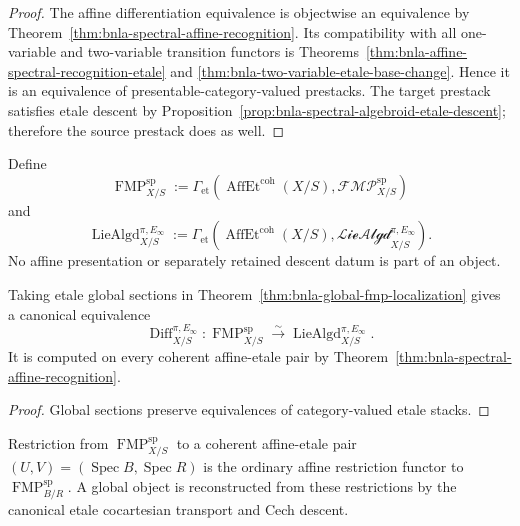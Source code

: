 \begin{proof}
The affine differentiation equivalence is objectwise an equivalence by
Theorem~\ref{thm:bnla-spectral-affine-recognition}.  Its compatibility with
all one-variable and two-variable transition functors is
Theorems~\ref{thm:bnla-affine-spectral-recognition-etale} and
\ref{thm:bnla-two-variable-etale-base-change}.  Hence it is an equivalence of
presentable-category-valued prestacks.  The target prestack satisfies etale
descent by
Proposition~\ref{prop:bnla-spectral-algebroid-etale-descent}; therefore the
source prestack does as well.
\end{proof}

\begin{definition}
\label{def:bnla-global-spectral-pair-sections}
Define
\[
\boxed{
    \operatorname{FMP}^{\mathrm{sp}}_{X/S}
    :=
    \Gamma_{\mathrm{et}}
    \left(
        \operatorname{AffEt}^{\mathrm{coh}}(X/S),
        \mathscr{FMP}^{\mathrm{sp}}_{X/S}
    \right)}
\]
and
\[
\boxed{
    \operatorname{LieAlgd}^{\pi,E_\infty}_{X/S}
    :=
    \Gamma_{\mathrm{et}}
    \left(
        \operatorname{AffEt}^{\mathrm{coh}}(X/S),
        \mathscr{LieAlgd}^{\pi,E_\infty}_{X/S}
    \right).}
\]
No affine presentation or separately retained descent datum is part of an
object.
\end{definition}

\begin{theorem}
\label{thm:bnla-global-spectral-recognition}
Taking etale global sections in
Theorem~\ref{thm:bnla-global-fmp-localization} gives a canonical equivalence
\[
\boxed{
    \operatorname{Diff}^{\pi,E_\infty}_{X/S}:
    \operatorname{FMP}^{\mathrm{sp}}_{X/S}
    \xrightarrow{\sim}
    \operatorname{LieAlgd}^{\pi,E_\infty}_{X/S}.}
\]
It is computed on every coherent affine-etale pair by
Theorem~\ref{thm:bnla-spectral-affine-recognition}.
\end{theorem}

\begin{proof}
Global sections preserve equivalences of category-valued etale stacks.
\end{proof}

\begin{theorem}
\label{prop:bnla-global-fmp-restriction}
Restriction from
$\operatorname{FMP}^{\mathrm{sp}}_{X/S}$ to a coherent affine-etale pair
$(U,V)=(\operatorname{Spec}B,\operatorname{Spec}R)$ is the ordinary affine
restriction functor to
$\operatorname{FMP}^{\mathrm{sp}}_{B/R}$.  A global object is reconstructed
from these restrictions by the canonical etale cocartesian transport and
Cech descent.
\end{theorem}

